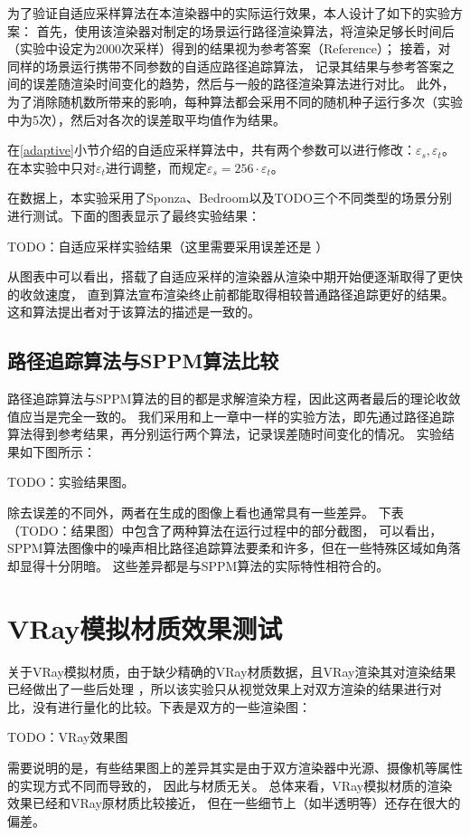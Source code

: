 为了验证自适应采样算法在本渲染器中的实际运行效果，本人设计了如下的实验方案：
首先，使用该渲染器对制定的场景运行路径渲染算法，将渲染足够长时间后（实验中设定为2000次采样）得到的结果视为参考答案（Reference）；
接着，对同样的场景运行携带不同参数的自适应路径追踪算法，
记录其结果与参考答案之间的误差随渲染时间变化的趋势，然后与一般的路径渲染算法进行对比。
此外，为了消除随机数所带来的影响，每种算法都会采用不同的随机种子运行多次（实验中为5次），然后对各次的误差取平均值作为结果。

在\ref{adaptive}小节介绍的自适应采样算法中，共有两个参数可以进行修改：$\varepsilon_s, \varepsilon_t$。
在本实验中只对$\varepsilon_t$进行调整，而规定$\varepsilon_s = 256\cdot \varepsilon_t$。

在数据上，本实验采用了Sponza、Bedroom以及TODO三个不同类型的场景分别进行测试。下面的图表显示了最终实验结果：

TODO：自适应采样实验结果（这里需要采用误差还是 ）

从图表中可以看出，搭载了自适应采样的渲染器从渲染中期开始便逐渐取得了更快的收敛速度，
直到算法宣布渲染终止前都能取得相较普通路径追踪更好的结果。
这和算法提出者对于该算法的描述是一致的。

\subsection{路径追踪算法与SPPM算法比较}

路径追踪算法与SPPM算法的目的都是求解渲染方程，因此这两者最后的理论收敛值应当是完全一致的。
我们采用和上一章中一样的实验方法，即先通过路径追踪算法得到参考结果，再分别运行两个算法，记录误差随时间变化的情况。
实验结果如下图所示：

TODO：实验结果图。

除去误差的不同外，两者在生成的图像上看也通常具有一些差异。
下表（TODO：结果图）中包含了两种算法在运行过程中的部分截图，
可以看出，SPPM算法图像中的噪声相比路径追踪算法要柔和许多，但在一些特殊区域如角落却显得十分阴暗。
这些差异都是与SPPM算法的实际特性相符合的。

\section{VRay模拟材质效果测试}

关于VRay模拟材质，由于缺少精确的VRay材质数据，且VRay渲染其对渲染结果已经做出了一些后处理
，所以该实验只从视觉效果上对双方渲染的结果进行对比，没有进行量化的比较。下表是双方的一些渲染图：

TODO：VRay效果图

需要说明的是，有些结果图上的差异其实是由于双方渲染器中光源、摄像机等属性的实现方式不同而导致的，
因此与材质无关。
总体来看，VRay模拟材质的渲染效果已经和VRay原材质比较接近，
但在一些细节上（如半透明等）还存在很大的偏差。

